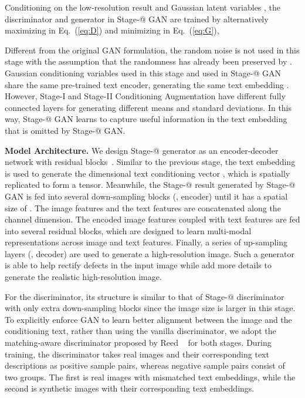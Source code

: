 \documentclass[10pt,twocolumn,letterpaper]{article}
\makeatletter
\newcommand{\Rmnum}[1]{\expandafter\@slowromancap\romannumeral #1@}
\makeatother
\begin{document}
Conditioning on the low-resolution result  and Gaussian latent variables , the discriminator  and generator  in Stage-\Rmnum{2} GAN are trained by alternatively maximizing  in Eq.~(\ref{eq:D}) and minimizing  in Eq.~(\ref{eq:G}), 


Different from the original GAN formulation, the random noise  is not used in this stage with the assumption that the randomness has already been preserved by . 
Gaussian conditioning variables  used in this stage and  used in Stage-\Rmnum{1} GAN share the same pre-trained text encoder, generating the same text embedding . 
However, Stage-I and Stage-II Conditioning Augmentation have different fully connected layers for generating different means and standard deviations. In this way, Stage-\Rmnum{2} GAN learns to capture useful information in the text embedding that is omitted by Stage-\Rmnum{1} GAN.


\textbf{Model Architecture. }
We design Stage-\Rmnum{2} generator as an encoder-decoder network with residual blocks~\cite{HeZRS15}. 
Similar to the previous stage, the text embedding  is used to generate the  dimensional text conditioning vector , which is spatially replicated to form a  tensor. 
Meanwhile, the Stage-\Rmnum{1} result  generated by Stage-\Rmnum{1} GAN is fed into several down-sampling blocks (\ie, encoder) until it has a spatial size of . The image features and the text features are concatenated along the channel dimension. 
The encoded image features coupled with text features are fed into several residual blocks, which are designed to learn multi-modal representations across image and text features. 
Finally, a series of up-sampling layers (\ie, decoder) are used to generate a  high-resolution image. Such a generator is able to help rectify defects in the input image while add more details to generate the realistic high-resolution image.

For the discriminator, its structure is similar to that of Stage-\Rmnum{1} discriminator with only extra down-sampling blocks since the image size is larger in this stage.  
To explicitly enforce GAN to learn better alignment between the image and the conditioning text, rather than using the vanilla discriminator, we adopt the matching-aware discriminator proposed by Reed \etal~\cite{reed2016generative} for both stages. 
During training, the discriminator takes real images and their corresponding text descriptions as positive sample pairs, whereas negative sample pairs consist of two groups. 
The first is real images with mismatched text embeddings, while the second is synthetic images with their corresponding text embeddings. 
\end{document}
